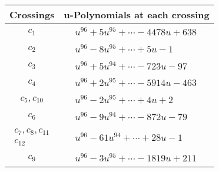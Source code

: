 \documentclass[1p]{elsarticle_modified}
\theoremstyle{definition}
\begin{document}
\begin{tabular}{m{50pt}|m{274pt}}
Crossings & \hspace{64pt}u-Polynomials at each crossing \\
\hline $$\begin{aligned}c_{1}\end{aligned}$$&$\begin{aligned}
&u^{96}+5 u^{95}+\cdots-4478 u+638
\end{aligned}$\\
\hline $$\begin{aligned}c_{2}\end{aligned}$$&$\begin{aligned}
&u^{96}-8 u^{95}+\cdots+5 u-1
\end{aligned}$\\
\hline $$\begin{aligned}c_{3}\end{aligned}$$&$\begin{aligned}
&u^{96}+5 u^{94}+\cdots-723 u-97
\end{aligned}$\\
\hline $$\begin{aligned}c_{4}\end{aligned}$$&$\begin{aligned}
&u^{96}+2 u^{95}+\cdots-5914 u-463
\end{aligned}$\\
\hline $$\begin{aligned}c_{5},c_{10}\end{aligned}$$&$\begin{aligned}
&u^{96}-2 u^{95}+\cdots+4 u+2
\end{aligned}$\\
\hline $$\begin{aligned}c_{6}\end{aligned}$$&$\begin{aligned}
&u^{96}-9 u^{94}+\cdots-872 u-79
\end{aligned}$\\
\hline $$\begin{aligned}c_{7},c_{8},c_{11}\\c_{12}\end{aligned}$$&$\begin{aligned}
&u^{96}-61 u^{94}+\cdots+28 u-1
\end{aligned}$\\
\hline $$\begin{aligned}c_{9}\end{aligned}$$&$\begin{aligned}
&u^{96}-3 u^{95}+\cdots-1819 u+211
\end{aligned}$\\
\hline
\end{tabular}\\~\\
\end{document}
